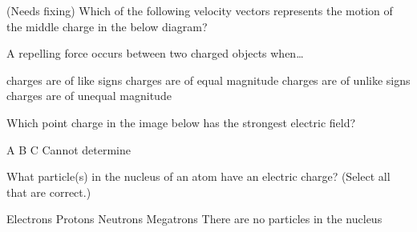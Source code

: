 \documentclass[]{exam}
\begin{document}
\begin{questions}
\question
(Needs fixing)
Which of the following velocity vectors represents the motion of the middle charge in the below diagram?

\question
A repelling force occurs between two charged objects when\ldots 

\begin{randomizechoices}
    \correctchoice charges are of like signs
    \choice charges are of equal magnitude
    \choice charges are of unlike signs
    \choice charges are of unequal magnitude
\end{randomizechoices}

\question
Which point charge in the image below has the strongest electric field?

\begin{center}
\hspace{1cm}
\hspace{1cm}
\end{center}

\begin{randomizechoices}[norandomize]
    \choice A
    \choice B
    \correctchoice C
    \choice Cannot determine
\end{randomizechoices}

\question
What particle(s) in the nucleus of an atom have an electric charge? (Select all that are correct.)

\begin{randomizechoices}[keeplast]
    \choice Electrons
    \correctchoice Protons
    \choice Neutrons
    \choice Megatrons
    \choice There are no particles in the nucleus
\end{randomizechoices}


\end{questions}
\end{document}
